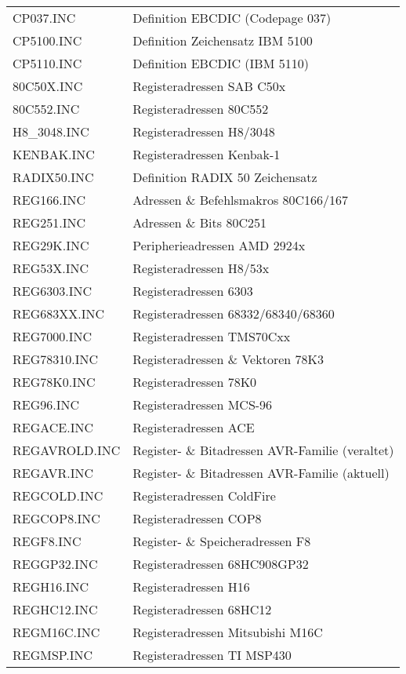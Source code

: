 \documentclass[12pt,a4paper,twoside]{report}
\begin{document}
\begin{center}
\begin{longtable}{|l|l|}
CP037.INC         & Definition EBCDIC (Codepage 037) \\
CP5100.INC        & Definition Zeichensatz IBM 5100 \\
CP5110.INC        & Definition EBCDIC (IBM 5110) \\
80C50X.INC        & Registeradressen SAB C50x \\
80C552.INC        & Registeradressen 80C552 \\
H8\_3048.INC      & Registeradressen H8/3048 \\
KENBAK.INC        & Registeradressen Kenbak-1 \\
RADIX50.INC       & Definition RADIX 50 Zeichensatz \\
REG166.INC        & Adressen \& Befehlsmakros 80C166/167 \\
REG251.INC        & Adressen \& Bits 80C251 \\
REG29K.INC        & Peripherieadressen AMD 2924x \\
REG53X.INC        & Registeradressen H8/53x \\
REG6303.INC       & Registeradressen 6303 \\
REG683XX.INC      & Registeradressen 68332/68340/68360 \\
REG7000.INC       & Registeradressen TMS70Cxx \\
REG78310.INC      & Registeradressen \& Vektoren 78K3 \\
REG78K0.INC       & Registeradressen 78K0 \\
REG96.INC         & Registeradressen MCS-96 \\
REGACE.INC        & Registeradressen ACE \\
REGAVROLD.INC     & Register- \& Bitadressen AVR-Familie (veraltet)\\
REGAVR.INC        & Register- \& Bitadressen AVR-Familie (aktuell)\\
REGCOLD.INC       & Registeradressen ColdFire \\
REGCOP8.INC       & Registeradressen COP8 \\
REGF8.INC         & Register- \& Speicheradressen F8 \\
REGGP32.INC       & Registeradressen 68HC908GP32 \\
REGH16.INC        & Registeradressen H16 \\
REGHC12.INC       & Registeradressen 68HC12 \\
REGM16C.INC       & Registeradressen Mitsubishi M16C \\
REGMSP.INC        & Registeradressen TI MSP430 \\

\end{longtable}
\end{center}
\end{document}
